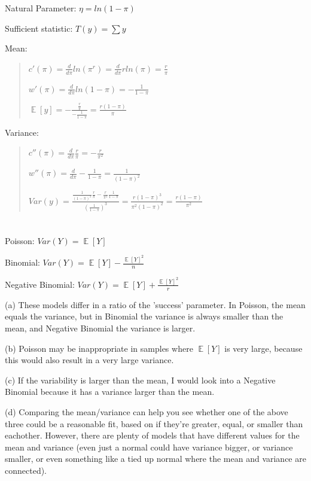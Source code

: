 \documentclass{article}
\DeclareMathOperator{\EX}{\mathbb{E}} %
\let\Oldsum=\sum
\renewcommand{\sum}{\Oldsum\limits}
\begin{document}
Natural Parameter: $\eta = ln(1-\pi)$

Sufficient statistic: $T(y) = \sum y$

Mean: 

\begin{quote}
$c'(\pi) = \frac{d}{d \pi} ln(\pi^r) = \frac{d}{d \pi} r ln(\pi) = \frac{r}{\pi}$

$w'(\pi) = \frac{d}{d \pi} ln(1-\pi) = -\frac{1}{1-\pi}$

$\EX[y] = -\frac{\frac{r}{\pi}}{-\frac{1}{1-\pi}} = \frac{r (1-\pi)}{\pi}$
\end{quote}

Variance: 

\begin{quote}
$c''(\pi) = \frac{d}{d \pi} \frac{r}{\pi} = -\frac{r}{\pi^2}$

$w''(\pi) = \frac{d}{d \pi} -\frac{1}{1-\pi} = \frac{1}{(1-\pi)^2}$

$Var(y) = \frac{\frac{1}{(1-\pi)^2}\frac{r}{\pi} - \frac{r}{\pi^2}\frac{1}{1-\pi}}{(\frac{1}{1-\pi})^3} = \frac{r(1-\pi)^3}{\pi^2 (1-\pi)^2} = \frac{r(1-\pi)}{\pi^2}$
\end{quote}


\section{}

Poisson: $Var(Y) = \EX[Y]$

Binomial: $Var(Y) = \EX[Y] - \frac{\EX[Y]^2}{n}$

Negative Binomial: $Var(Y) = \EX[Y] + \frac{\EX[Y]^2}{r}$

(a) These models differ in a ratio of the 'success' parameter. In Poisson, the mean equals the variance, but in Binomial the variance is always smaller than the mean, and Negative Binomial the variance is larger. 

(b) Poisson may be inappropriate in samples where $\EX[Y]$ is very large, because this would also result in a very large variance. 

(c) If the variability is larger than the mean, I would look into a Negative Binomial because it has a variance larger than the mean. 

(d) Comparing the mean/variance can help you see whether one of the above three could be a reasonable fit, based on if they're greater, equal, or smaller than eachother. However, there are plenty of models that have different values for the mean and variance (even just a normal could have variance bigger, or variance smaller, or even something like a tied up normal where the mean and variance are connected).
\end{document}
